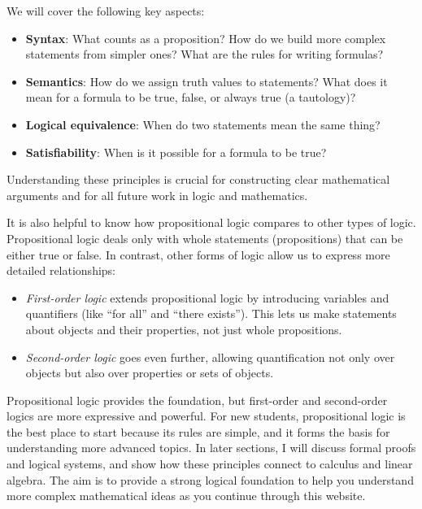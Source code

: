 \documentclass[a4paper, twoside]{article}
\begin{document}
We will cover the following key aspects:

\begin{itemize}
    \item \textbf{Syntax}: What counts as a proposition? How do we build more complex statements from simpler ones? What are the rules for writing formulas?

    \item \textbf{Semantics}: How do we assign truth values to statements? What does it mean for a formula to be true, false, or always true (a tautology)?

    \item \textbf{Logical equivalence}: When do two statements mean the same thing?

    \item \textbf{Satisfiability}: When is it possible for a formula to be true?
\end{itemize}

Understanding these principles is crucial for constructing clear mathematical arguments and for all future work in logic and mathematics.

It is also helpful to know how propositional logic compares to other types of logic. Propositional logic deals only with whole statements (propositions) that can be either true or false. In contrast, other forms of logic allow us to express more detailed relationships:

\begin{itemize}
    \item \textit{First-order logic} extends propositional logic by introducing variables and quantifiers (like “for all” and “there exists”). This lets us make statements about objects and their properties, not just whole propositions.

    \item \textit{Second-order logic} goes even further, allowing quantification not only over objects but also over properties or sets of objects.
\end{itemize}



Propositional logic provides the foundation, but first-order and second-order logics are more expressive and powerful. For new students, propositional logic is the best place to start because its rules are simple, and it forms the basis for understanding more advanced topics. In later sections, I will discuss formal proofs and logical systems, and show how these principles connect to calculus and linear algebra. The aim is to provide a strong logical foundation to help you understand more complex mathematical ideas as you continue through this website.
\end{document}

